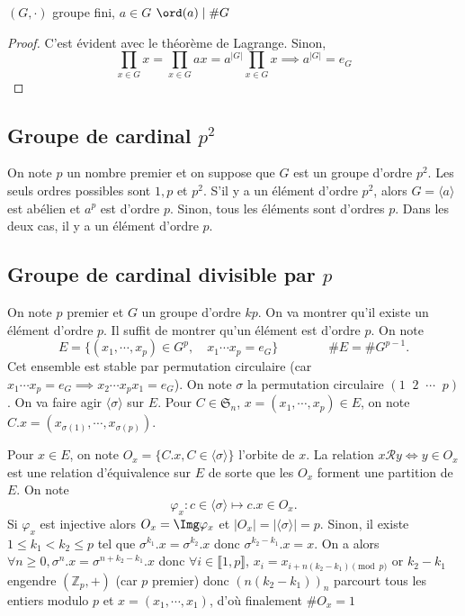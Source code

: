 \begin{prop}
    \Hyp $(G, \cdot)$ groupe fini, $a\in G$
    \Conc $\ord(a)\;|\;\# G$
\end{prop}

\begin{proof}
    C'est évident avec le théorème de Lagrange. Sinon, \[
        \prod_{x\in G}x=\prod_{x\in G}ax=a^{|G|}\prod_{x\in G}x \implies a^{|G|}=e_G
    \]
\end{proof}

\subsection{Groupe de cardinal $p^2$}

On note $p$ un nombre premier et on suppose que $G$ est un groupe d'ordre $p^2$. Les seuls ordres possibles sont $1, p$ et $p^2$. S'il y a un élément d'ordre $p^2$, alors $G=\langle a\rangle$ est abélien et $a^p$ est d'ordre $p$. Sinon, tous les éléments sont d'ordres $p$. Dans les deux cas, il y a un élément d'ordre $p$.

\subsection{Groupe de cardinal divisible par $p$}

On note $p$ premier et $G$ un groupe d'ordre $kp$. On va montrer qu'il existe un élément d'ordre $p$. Il suffit de montrer qu'un élément est d'ordre $p$. On note \[
    E=\{(x_1, \cdots, x_p)\in G^p, \quad x_1 \cdots x_p=e_G\}\qquad \qquad \#E=\#G^{p-1}.
\]
Cet ensemble est stable par permutation circulaire (car $x_1\cdots x_p=e_G \implies x_2\cdots x_px_1=e_G$). On note $\sigma$ la permutation circulaire $(1\;\; 2 \;\; \cdots \;\; p)$. On va faire agir $\langle \sigma \rangle$ sur $E$. Pour $C\in \mathfrak S_n$, $x=(x_1, \cdots, x_p)\in E$, on note $C.x=(x_{\sigma(1)}, \cdots, x_{\sigma(p)})$.

Pour $x\in E$, on note $O_x=\{C.x, C\in\langle \sigma\rangle\}$ l'orbite de $x$. La relation $x\mathcal Ry\iff y\in O_x$ est une relation d'équivalence sur $E$ de sorte que les $O_x$ forment une partition de $E$. On note \[
    \varphi_x:c\in \langle \sigma \rangle \longmapsto c.x\in O_x.
\]
Si $\varphi_x$ est injective alors $O_x=\Img \varphi_x$ et $|O_x|=|\langle \sigma \rangle|=p$. Sinon, il existe $1\leq k_1 < k_2\leq p$ tel que $\sigma^{k_1}.x=\sigma^{k_2}.x$ donc $\sigma^{k_2-k_1}.x=x$. On a alors $\forall n\geq 0, \sigma^n.x=\sigma^{n+k_2-k_1}.x$ donc $\forall i\in\llbracket 1, p\rrbracket$, $x_i=x_{i+n(k_2-k_1)\pmod p}$ or $k_2-k_1$ engendre $(\mathbb Z_p, +)$ (car $p$ premier) donc $(n(k_2-k_1))_n$ parcourt tous les entiers modulo $p$ et $x=(x_1, \cdots, x_1)$, d'où finalement $\#O_x=1$


